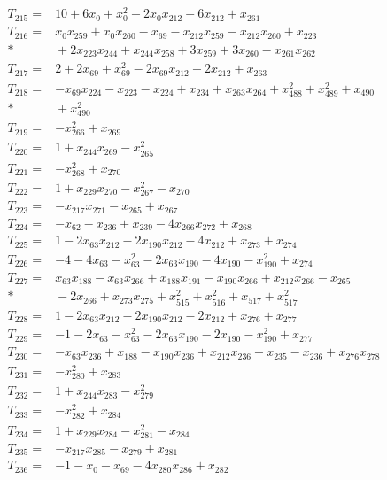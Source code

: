 \begin{align*}
T_{215}={}&10+6x_{0}+x_{0}^{2}-2x_{0}x_{212}-6x_{212}+x_{261}\\[3pt]
T_{216}={}&x_{0}x_{259}+x_{0}x_{260}-x_{69}-x_{212}x_{259}-x_{212}x_{260}+x_{223}\\*
&{}+2x_{223}x_{244}+x_{244}x_{258}+3x_{259}+3x_{260}-x_{261}x_{262}\\[3pt]
T_{217}={}&2+2x_{69}+x_{69}^{2}-2x_{69}x_{212}-2x_{212}+x_{263}\\[3pt]
T_{218}={}&-x_{69}x_{224}-x_{223}-x_{224}+x_{234}+x_{263}x_{264}+x_{488}^{2}+x_{489}^{2}+x_{490}\\*
&{}+x_{490}^{2}\\[3pt]
T_{219}={}&-x_{266}^{2}+x_{269}\\[3pt]
T_{220}={}&1+x_{244}x_{269}-x_{265}^{2}\\[3pt]
T_{221}={}&-x_{268}^{2}+x_{270}\\[3pt]
T_{222}={}&1+x_{229}x_{270}-x_{267}^{2}-x_{270}\\[3pt]
T_{223}={}&-x_{217}x_{271}-x_{265}+x_{267}\\[3pt]
T_{224}={}&-x_{62}-x_{236}+x_{239}-4x_{266}x_{272}+x_{268}\\[3pt]
T_{225}={}&1-2x_{63}x_{212}-2x_{190}x_{212}-4x_{212}+x_{273}+x_{274}\\[3pt]
T_{226}={}&-4-4x_{63}-x_{63}^{2}-2x_{63}x_{190}-4x_{190}-x_{190}^{2}+x_{274}\\[3pt]
T_{227}={}&x_{63}x_{188}-x_{63}x_{266}+x_{188}x_{191}-x_{190}x_{266}+x_{212}x_{266}-x_{265}\\*
&{}-2x_{266}+x_{273}x_{275}+x_{515}^{2}+x_{516}^{2}+x_{517}+x_{517}^{2}\\[3pt]
T_{228}={}&1-2x_{63}x_{212}-2x_{190}x_{212}-2x_{212}+x_{276}+x_{277}\\[3pt]
T_{229}={}&-1-2x_{63}-x_{63}^{2}-2x_{63}x_{190}-2x_{190}-x_{190}^{2}+x_{277}\\[3pt]
T_{230}={}&-x_{63}x_{236}+x_{188}-x_{190}x_{236}+x_{212}x_{236}-x_{235}-x_{236}+x_{276}x_{278}\\[3pt]
T_{231}={}&-x_{280}^{2}+x_{283}\\[3pt]
T_{232}={}&1+x_{244}x_{283}-x_{279}^{2}\\[3pt]
T_{233}={}&-x_{282}^{2}+x_{284}\\[3pt]
T_{234}={}&1+x_{229}x_{284}-x_{281}^{2}-x_{284}\\[3pt]
T_{235}={}&-x_{217}x_{285}-x_{279}+x_{281}\\[3pt]
T_{236}={}&-1-x_{0}-x_{69}-4x_{280}x_{286}+x_{282}\\[3pt]

\end{align*}
